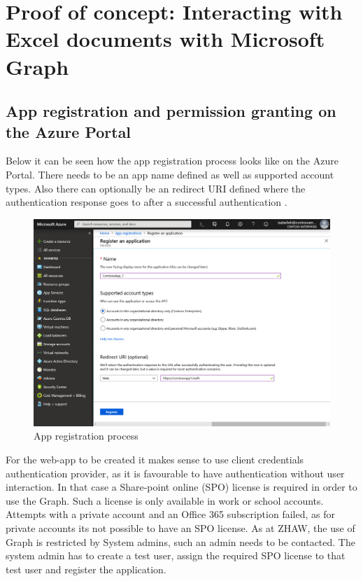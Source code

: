\chapter{Proof of concept: Interacting with Excel documents with Microsoft Graph} %

\label{Proof of concept1} %


\section{App registration and permission granting on the Azure Portal}

Below it can be seen how the app registration process looks like on the Azure Portal. There needs to be an app name defined as well as supported account types. Also there can optionally be an redirect URI defined where the authentication response goes to after a successful authentication \cite{MSAppReg}. 

\begin{figure}[h!]
  \includegraphics[scale=0.45]{Figures/new-app-registration-expanded.png}
  \caption{App registration process}
  \label{fig:App registration process}
\end{figure}

For the web-app to be created it makes sense to use client credentials authentication provider, as it is favourable to have authentication without user interaction. In that case a Share-point online (SPO) license is required in order to use the Graph. Such a license is only available in work or school accounts. Attempts with a private account and an Office 365 subscription failed, as for private accounts its not possible to have an SPO license. As at ZHAW, the use of Graph is restricted by System admins, such an admin needs to be contacted. The system admin has to create a test user, assign the required SPO license to that test user and register the application. 

